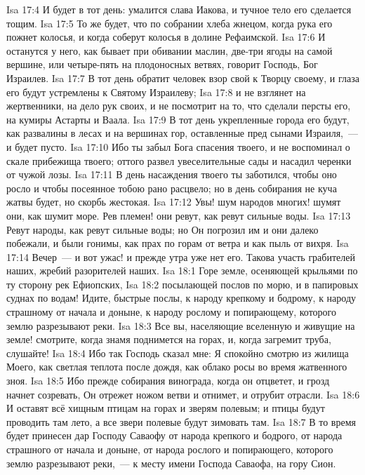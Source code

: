 \rsbpar\vs Isa 17:4 И будет в тот день: умалится слава Иакова, и тучное тело его сделается тощим.
\vs Isa 17:5 То же будет, что по собрании хлеба жнецом, когда рука его пожнет колосья, и когда соберут колосья в долине Рефаимской.
\vs Isa 17:6 И останутся у него, как бывает при обивании маслин, две-три ягоды на самой вершине, или четыре-пять на плодоносных ветвях, говорит Господь, Бог Израилев.
\vs Isa 17:7 В тот день обратит человек взор свой к Творцу своему, и глаза его будут устремлены к Святому Израилеву;
\vs Isa 17:8 и не взглянет на жертвенники, на дело рук своих, и не посмотрит на то, что сделали персты его, на кумиры Астарты и Ваала.
\vs Isa 17:9 В тот день укрепленные города его будут, как развалины в лесах и на вершинах гор, оставленные пред сынами Израиля,~--- и будет пусто.
\vs Isa 17:10 Ибо ты забыл Бога спасения твоего, и не воспоминал о скале прибежища твоего; оттого развел увеселительные сады и насадил черенки от чужой лозы.
\vs Isa 17:11 В день насаждения твоего ты заботился, чтобы оно росло и чтобы посеянное тобою рано расцвело; но в день собирания не куча жатвы будет, но скорбь жестокая.
\vs Isa 17:12 Увы! шум народов многих! шумят они, как шумит море. Рев племен! они ревут, как ревут сильные воды.
\vs Isa 17:13 Ревут народы, как ревут сильные воды; но Он погрозил им и они далеко побежали, и были гонимы, как прах по горам от ветра и как пыль от вихря.
\vs Isa 17:14 Вечер~--- и вот ужас! и прежде утра уже нет его. Такова участь грабителей наших, жребий разорителей наших.
\vs Isa 18:1 Горе земле, осеняющей крыльями по ту сторону рек Ефиопских,
\vs Isa 18:2 посылающей послов по морю, и в папировых суднах по водам! Идите, быстрые послы, к народу крепкому и бодрому, к народу страшному от начала и доныне, к народу рослому и  попирающему, которого землю разрезывают реки.
\vs Isa 18:3 Все вы, населяющие вселенную и живущие на земле! смотрите, когда знамя поднимется на горах, и, когда загремит труба, слушайте!
\vs Isa 18:4 Ибо так Господь сказал мне: Я спокойно смотрю из жилища Моего, как светлая теплота после дождя, как облако росы во время жатвенного зноя.
\vs Isa 18:5 Ибо прежде собирания винограда, когда он отцветет, и грозд начнет созревать, Он отрежет ножом ветви и отнимет, и отрубит отрасли.
\vs Isa 18:6 И оставят всё хищным птицам на горах и зверям полевым; и птицы будут проводить там лето, а все звери полевые будут зимовать там.
\vs Isa 18:7 В то время будет принесен дар Господу Саваофу от народа крепкого и бодрого, от народа страшного от начала и доныне, от народа рослого и  попирающего, которого землю разрезывают реки,~--- к месту имени Господа Саваофа, на гору Сион.
